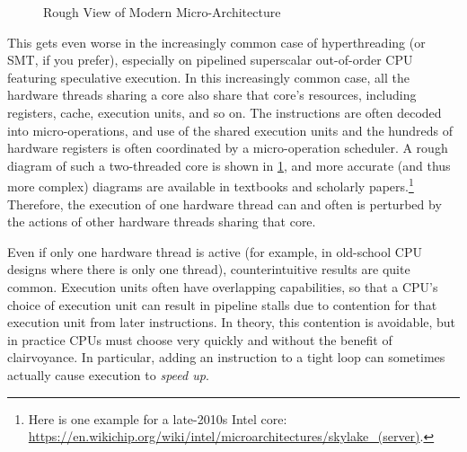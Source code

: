 \begin{figure}
\centering
{}
\caption{Rough View of Modern Micro-Architecture}
\label{fig:cpu:Rough View of Modern Micro-Architecture}
\end{figure}

This gets even worse in the increasingly common case of hyperthreading
(or SMT, if you prefer), especially on pipelined superscalar out-of-order
CPU featuring speculative execution.
In this increasingly common case, all the hardware threads sharing
a core also share that core's resources, including registers, cache,
execution units, and so on.
The instructions are often decoded into micro-operations, and use of the
shared execution units and the hundreds of hardware registers is often
coordinated by a micro-operation scheduler.
A rough diagram of such a two-threaded core is shown in
\cref{fig:cpu:Rough View of Modern Micro-Architecture},
and more accurate (and thus more complex) diagrams are available in
textbooks and scholarly papers.\footnote{
	Here is one example for a late-2010s Intel core:
	\url{https://en.wikichip.org/wiki/intel/microarchitectures/skylake_(server)}.}
Therefore, the execution of one hardware thread can and often is perturbed
by the actions of other hardware threads sharing that core.

Even if only one hardware thread is active (for example, in old-school
CPU designs where there is only one thread), counterintuitive results
are quite common.
Execution units often have overlapping capabilities, so that a CPU's
choice of execution unit can result in pipeline stalls due to contention
for that execution unit from later instructions.
In theory, this contention is avoidable, but in practice CPUs must choose
very quickly and without the benefit of clairvoyance.
In particular, adding an instruction to a tight loop can sometimes
actually cause execution to \emph{speed up}.

